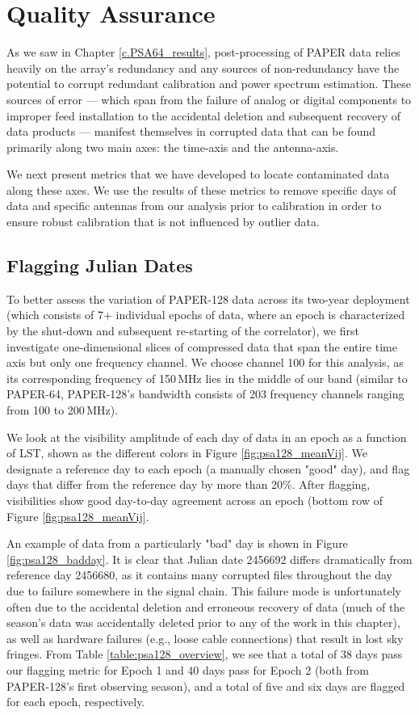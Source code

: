 \section{Quality Assurance}

As we saw in Chapter \ref{c.PSA64_results}, post-processing of PAPER data relies heavily on the array's redundancy and any sources of non-redundancy have the potential to corrupt redundant calibration and power spectrum estimation. These sources of error --- which span from the failure of analog or digital components to improper feed installation to the accidental deletion and subsequent recovery of data products --- manifest themselves in corrupted data that can be found primarily along two main axes: the time-axis and the antenna-axis. 

We next present metrics that we have developed to locate contaminated data along these axes. We use the results of these metrics to remove specific days of data and specific antennas from our analysis prior to calibration in order to ensure robust calibration that is not influenced by outlier data.

\subsection{Flagging Julian Dates}

To better assess the variation of PAPER-128 data across its two-year deployment (which consists of 7+ individual epochs of data, where an epoch is characterized by the shut-down and subsequent re-starting of the correlator), we first investigate one-dimensional slices of compressed data that span the entire time axis but only one frequency channel. We choose channel 100 for this analysis, as its corresponding frequency of 150\,MHz lies in the middle of our band (similar to PAPER-64, PAPER-128's bandwidth consists of 203 frequency channels ranging from 100 to 200\,MHz).

We look at the visibility amplitude of each day of data in an epoch as a function of LST, shown as the different colors in Figure \ref{fig:psa128_meanVij}. We designate a reference day to each epoch (a manually chosen "good" day), and flag days that differ from the reference day by more than 20\%. After flagging, visibilities show good day-to-day agreement across an epoch (bottom row of Figure \ref{fig:psa128_meanVij}.

An example of data from a particularly "bad" day is shown in Figure \ref{fig:psa128_badday}. It is clear that Julian date 2456692 differs dramatically from reference day 2456680, as it contains many corrupted files throughout the day due to failure somewhere in the signal chain. This failure mode is unfortunately often due to the accidental deletion and erroneous recovery of data (much of the season's data was accidentally deleted prior to any of the work in this chapter), as well as hardware failures (e.g., loose cable connections) that result in lost sky fringes. From Table \ref{table:psa128_overview}, we see that a total of 38 days pass our flagging metric for Epoch 1 and 40 days pass for Epoch 2 (both from PAPER-128's first observing season), and a total of five and six days are flagged for each epoch, respectively.

